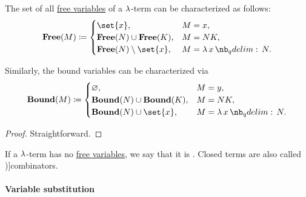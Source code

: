 \begin{proposition}\label{thm:lambda_variable_freeness_characterization}
  The set of all \hyperref[def:lambda_variable_freeness]{free variables} of a \( \mathrm{\lambda} \)-term can be characterized as follows:
  \begin{equation*}
    \op*{Free}(M) \coloneqq \begin{cases}
      \set{ x },                              &M = x, \\
      \op*{Free}(N) \cup \op*{Free}(K), &M = N K, \\
      \op*{Free}(N) \setminus \set{ x },   &M = \qabs x N. \\
    \end{cases}
  \end{equation*}

  Similarly, the bound variables can be characterized via
  \begin{equation*}
    \op*{Bound}(M) \coloneqq \begin{cases}
      \varnothing,                              &M = y, \\
      \op*{Bound}(N) \cup \op*{Bound}(K), &M = N K, \\
      \op*{Bound}(N) \cup \set{ x },         &M = \qabs x N. \\
    \end{cases}
  \end{equation*}
\end{proposition}
\begin{proof}
  Straightforward.
\end{proof}

\begin{definition}\label{def:lambda_combinator}
  If a \( \mathrm{\lambda} \)-term has no \hyperref[def:lambda_variable_freeness]{free variables}, we say that it is . Closed terms are also called \term[ru=комбинаторы (\cite[188]{Герасимов2011})]{combinators}.
\end{definition}

\paragraph{Variable substitution}

